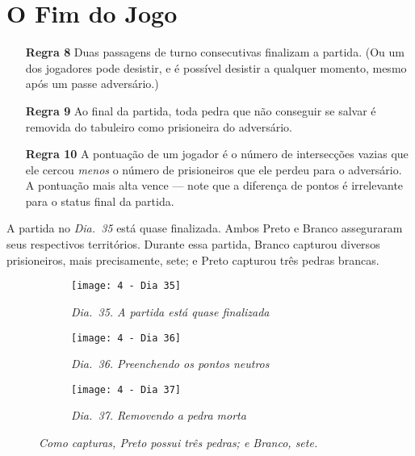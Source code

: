 \chapter{O Fim do Jogo}

\begin{itemize}
    \item[\textbf{Regra 8}] Duas passagens de turno consecutivas finalizam a partida. (Ou um dos jogadores pode desistir, e é possível desistir a qualquer momento, mesmo após um passe adversário.)
    \item[\textbf{Regra 9}] Ao final da partida, toda pedra que não conseguir se salvar é removida do tabuleiro como prisioneira do adversário.
    \item[\textbf{Regra 10}] A pontuação de um jogador é o número de intersecções vazias que ele cercou \emph{menos} o número de prisioneiros que ele perdeu para o adversário. A pontuação mais alta vence --- note que a diferença de pontos é irrelevante para o status final da partida.
\end{itemize}

\pagebreak

A partida no \emph{Dia.\@~35} está quase finalizada. Ambos Preto e Branco asseguraram seus respectivos territórios. Durante essa partida, Branco capturou diversos prisioneiros, mais precisamente, sete; e Preto capturou três pedras brancas.

\begin{figure}[h!]
    \centering
    \begin{subfigure}[t]{.3\textwidth}
        \centering
        \texttt{[image: 4 - Dia 35]}
        \caption*{\emph{Dia.\@~35. A partida está quase finalizada}}
    \end{subfigure}
    \hfill
    \begin{subfigure}[t]{.3\textwidth}
        \centering
        \texttt{[image: 4 - Dia 36]}
        \caption*{\emph{Dia.\@~36. Preenchendo os pontos neutros}}
    \end{subfigure}
    \hfill
    \begin{subfigure}[t]{.3\textwidth}
        \centering
        \texttt{[image: 4 - Dia 37]}
        \caption*{\emph{Dia.\@~37. Removendo a pedra morta}}
    \end{subfigure}
    \vspace*{.5cm}
    \caption*{\emph{Como capturas, Preto possui três pedras; e Branco, sete.}}
\end{figure}
 

